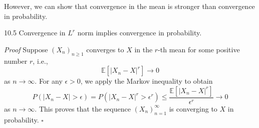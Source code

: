However, we can show that convergence in the mean is stronger than convergence in probability.

\begin{thmbox}{10.5}
Convergence in $L^r$ norm implies convergence in probability.
\end{thmbox}

\textit{Proof}
Suppose $(X_n)_{n\geq 1}$ converges to $X$ in the $r$-th mean for some positive number $r$, i.e.,
\[
\mathbb{E}[\lvert X_n-X\rvert^r]\to 0
\]
as $n\to\infty$. For any $\epsilon>0$, we apply the Markov inequality to obtain
\[
P(\lvert X_n-X\rvert>\epsilon)
=P(\lvert X_n-X\rvert^r>\epsilon^r)
\leq
\frac{\mathbb{E}[\lvert X_n-X\rvert^r]}{\epsilon^r}
\to 0
\]
as $n\to\infty$. This proves that the sequence $(X_n)_{n=1}^{\infty}$ is converging to $X$ in probability.
\hfill $\square$
